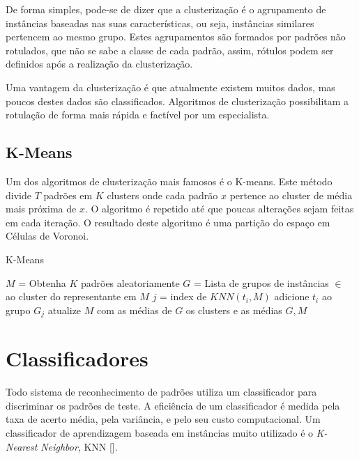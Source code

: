 De forma simples, pode-se de dizer que a clusterização é o agrupamento de instâncias baseadas nas suas características, ou seja, instâncias similares pertencem ao mesmo grupo. Estes agrupamentos são formados por padrões não rotulados, que não se sabe a classe de cada padrão, assim, rótulos podem ser definidos após a realização da clusterização.

Uma vantagem da clusterização é que atualmente existem muitos dados, mas poucos destes dados são classificados. Algoritmos de clusterização possibilitam a rotulação de forma mais rápida e factível por um especialista.

\subsection{K-Means}
\label{subsec:teoria-kmeans}

Um dos algoritmos de clusterização mais famosos é o K-means. Este método divide $T$ padrões em $K$ clusters onde cada padrão $x$ pertence ao cluster de média mais próxima de $x$. O algoritmo é repetido até que poucas alterações sejam feitas em cada iteração. O resultado deste algoritmo é uma partição do espaço em Células de Voronoi.

\begin{algorithm}[H]
\caption{K-Means}
\label{alg:kmeans}
\begin{algorithmic}[1]
\STATE  $M$ = Obtenha $K$ padrões aleatoriamente
\STATE  $G$ = Lista de grupos de instâncias $\in$ ao cluster do representante em $M$
\STATE  $j$ = index de $KNN(t_i, M)$
\STATE  adicione $t_i$ ao grupo $G_j$
\ENDFOR
\STATE atualize $M$ com as médias de $G$
\ENDWHILE
\RETURN os clusters e as médias $G, M$
\end{algorithmic}
\end{algorithm}

\section{Classificadores}
\label{sec:classificadores}

Todo sistema de reconhecimento de padrões utiliza um classificador para discriminar os padrões de teste. A eficiência de um classificador é medida pela taxa de acerto média, pela variância, e pelo seu custo computacional. Um classificador de aprendizagem baseada em instâncias muito utilizado é o \textit{K-Nearest Neighbor}, KNN [\cite{knnrule:1969}]. 

